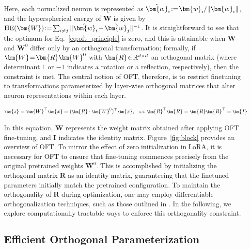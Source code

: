 Here, each normalized neuron is represented as $\thickmuskip=2mu \medmuskip=2mu \hat{\bm{w}}_i:=\bm{w}_i/\|\bm{w}_i\|$, and the hyperspherical energy of $\bm{W}$ is given by $\thickmuskip=2mu \medmuskip=2mu \text{HE}(\bm{W}):= \sum_{i\neq j} \|\hat{\bm{w}}_i-\hat{\bm{w}}_j\|^{-1}$. It is straightforward to see that the optimum for Eq.~\eqref{eq:oft_principle} is zero, and this is attainable when $\bm{W}$ and $\bm{W}^0$ differ only by an orthogonal transformation; formally, if $\thickmuskip=2mu \medmuskip=2mu \bm{W}=\bm{R}\bm{W}^0$ with $\thickmuskip=2mu \medmuskip=2mu \bm{R}\in\mathbb{R}^{d\times d}$ an orthogonal matrix (where determinant $1$ or $-1$ indicates a rotation or a reflection, respectively), then the constraint is met. The central notion of OFT, therefore, is to restrict finetuning to transformations parameterized by layer-wise orthogonal matrices that alter neuron representations within each layer.

\begin{equation}\label{eq:oft_general}
    \footnotesize
    \bm{z}=\bm{W}^\top\bm{x}=(\bm{R}\cdot\bm{W}^0)^\top\bm{x},~~~\text{s.t.}~\bm{R}^\top\bm{R}=\bm{R}\bm{R}^\top=\bm{I}
\end{equation}

In this equation, $\bm{W}$ represents the weight matrix obtained after applying OFT fine-tuning, and $\bm{I}$ indicates the identity matrix. Figure~\ref{fig:block} provides an overview of OFT. To mirror the effect of zero initialization in LoRA, it is necessary for OFT to ensure that fine-tuning commences precisely from the original pretrained weights $\bm{W}^0$. This is accomplished by initializing the orthogonal matrix $\bm{R}$ as an identity matrix, guaranteeing that the finetuned parameters initially match the pretrained configuration. To maintain the orthogonality of $\bm{R}$ during optimization, one may employ differentiable orthogonalization techniques, such as those outlined in \cite{liu2021orthogonal,lezcano2019cheap}. In the following, we explore computationally tractable ways to enforce this orthogonality constraint.

\subsection{Efficient Orthogonal Parameterization}\label{sect:eff_ortho}

